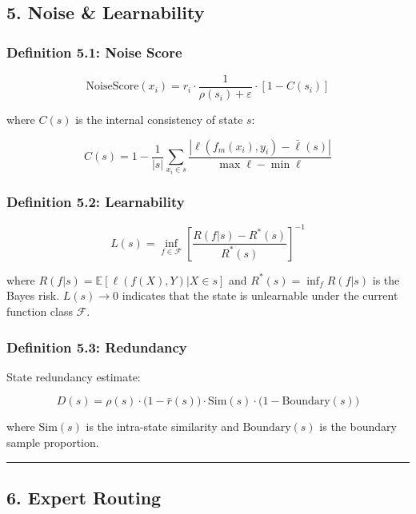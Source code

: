 \documentclass[
  12pt,
]{ctexart}
\begin{document}
\subsection{5. Noise \& Learnability}\label{noise-learnability}

\subsubsection{Definition 5.1: Noise Score}\label{definition-5.1-noise-score}

\[\text{NoiseScore}(x_i) = r_i \cdot \frac{1}{\rho(s_i) + \varepsilon} \cdot [1 - C(s_i)]\]

where \(C(s)\) is the internal consistency of state \(s\):

\[C(s) = 1 - \frac{1}{|s|} \sum_{x_i \in s} \frac{|\ell(f_m(x_i), y_i) - \bar{\ell}(s)|}{\max \ell - \min \ell}\]

\subsubsection{Definition 5.2: Learnability}\label{definition-5.2-learnability}

\[L(s) = \inf_{f \in \mathcal{F}} \left[ \frac{R(f|s) - R^*(s)}{R^*(s)} \right]^{-1}\]

where
\(R(f|s) = \mathbb{E}[\ell(f(X), Y) | X \in s]\) and \(R^*(s) = \inf_f R(f|s)\)
is the Bayes risk. \(L(s) \to 0\) indicates that the state is unlearnable under the current function class \(\mathcal{F}\).

\subsubsection{Definition 5.3: Redundancy}\label{definition-5.3-redundancy}

State redundancy estimate:

\[D(s) = \rho(s) \cdot \bigl(1 - \bar{r}(s)\bigr) \cdot \text{Sim}(s) \cdot \bigl(1 - \text{Boundary}(s)\bigr)\]

where \(\text{Sim}(s)\) is the intra-state similarity and \(\text{Boundary}(s)\)
is the boundary sample proportion.

\begin{center}\rule{0.5\linewidth}{0.5pt}\end{center}

\subsection{6. Expert Routing}\label{expert-routing}
\end{document}
